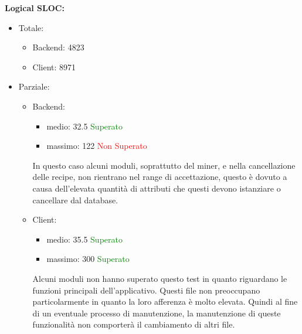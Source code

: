 \begin{description}
				\item \textbf{Logical SLOC:}\\
					\begin{itemize}	
						\item Totale:
							\begin{itemize}
								\item Backend: 4823
								\item Client: 8971
							\end{itemize}
						\item Parziale:
							\begin{itemize}		
								\item Backend:
									\begin{itemize}
										\item medio: 32.5 \textcolor{green}{Superato}
										\item massimo: 122 \textcolor{red}{Non Superato}
									\end{itemize}
					In questo caso alcuni moduli, soprattutto del miner, e nella cancellazione delle recipe, non rientrano nel range di accettazione, questo è dovuto a causa dell’elevata quantità di attributi che questi devono istanziare o cancellare dal database.			
					\item Client:
						\begin{itemize}
							\item medio: 35.5 \textcolor{green}{Superato}
							\item massimo: 300 \textcolor{green}{Superato}
						\end{itemize}
					Alcuni moduli non hanno superato questo test in quanto riguardano le funzioni principali dell'applicativo. Questi file non preoccupano particolarmente in quanto la loro afferenza è molto elevata. Quindi al fine di un eventuale processo di manutenzione, la manutenzione di queste funzionalità non comporterà il cambiamento di altri file.
					\end{itemize}
					\end{itemize}
			\end{description}
	
\pagebreak
